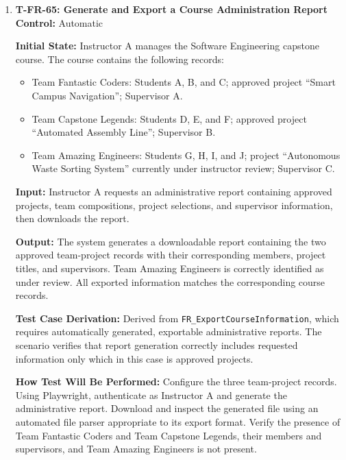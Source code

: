 \documentclass[12pt, titlepage]{article}
\begin{document}
\begin{enumerate}
\textbf{How Test Will Be Performed:} Configure the courses, teams, projects, and user assignments as specified. Using Playwright, authenticate as Instructor A and verify access to Team Amazing Engineers and Team Fantastic Coders, including their project statuses and relevant discussions. Verify that Team Capstone Legends' administrative records are accessible as well. Repeat the procedure as TA A and confirm that both Software Engineering teams are accessible despite TA A's individual assignment to Team Amazing Engineers. Attempt to access Team Capstone Legends' records directly as TA A and verify that access is denied.

\item \label{T-FR-65}\textbf{T-FR-65: Generate and Export a Course Administration Report}\\

\textbf{Control:} Automatic

\textbf{Initial State:} Instructor A manages the Software Engineering capstone course. The course contains the following records:
\begin{itemize}
    \item Team Fantastic Coders: Students A, B, and C; approved project ``Smart Campus Navigation'';
    Supervisor A.
    \item Team Capstone Legends: Students D, E, and F; approved project ``Automated Assembly Line''; Supervisor B.
    \item Team Amazing Engineers: Students G, H, I, and J; project ``Autonomous Waste Sorting System'' currently under instructor review; Supervisor C.
\end{itemize}

\textbf{Input:} Instructor A requests an administrative report containing approved projects, team compositions, project selections, and supervisor information, then downloads the report.

\textbf{Output:} The system generates a downloadable report containing the two approved team-project records with their corresponding members, project titles, and supervisors. Team Amazing Engineers is correctly identified as under review. All exported information matches the corresponding course records.

\textbf{Test Case Derivation:} Derived from \texttt{FR\_ExportCourseInformation}, which requires automatically generated, exportable administrative reports. The scenario verifies that report generation correctly includes requested information only which in this case is approved projects.

\textbf{How Test Will Be Performed:} Configure the three team-project records. Using Playwright, authenticate as Instructor A and generate the administrative report. Download and inspect the generated file using an automated file parser appropriate to its export format. Verify the presence of Team Fantastic Coders and Team Capstone Legends, their members and supervisors, and Team Amazing Engineers is not present.

\end{enumerate}
\end{document}
